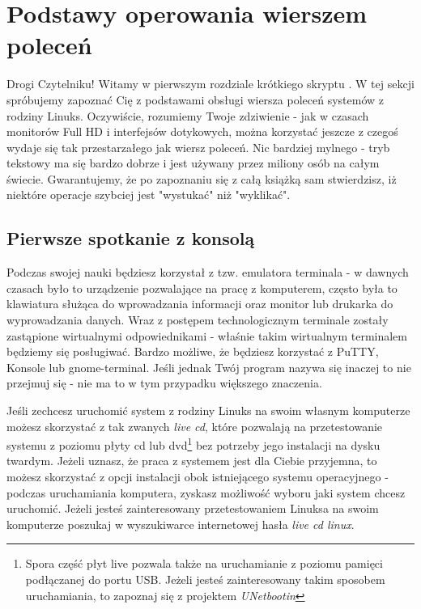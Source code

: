 \chapter{Podstawy operowania wierszem poleceń}
Drogi Czytelniku! \newline
Witamy w pierwszym rozdziale krótkiego skryptu \doctitle.
W tej sekcji spróbujemy zapoznać Cię z podstawami obsługi wiersza poleceń systemów z rodziny Linuks. Oczywiście, rozumiemy Twoje zdziwienie - jak w czasach monitorów Full HD i interfejsów dotykowych, można korzystać jeszcze z czegoś wydaje się tak przestarzałego jak wiersz poleceń. Nic bardziej mylnego - tryb tekstowy ma się bardzo dobrze i jest używany przez miliony osób na całym świecie. Gwarantujemy, że po zapoznaniu się z całą książką sam stwierdzisz, iż niektóre operacje szybciej jest "wystukać" niż "wyklikać".

\section{Pierwsze spotkanie z konsolą}
Podczas swojej nauki będziesz korzystał z tzw. emulatora terminala - w dawnych czasach było to urządzenie pozwalające na pracę z komputerem, często była to klawiatura służąca do wprowadzania informacji oraz monitor lub drukarka do wyprowadzania danych. Wraz z postępem technologicznym terminale zostały zastąpione wirtualnymi odpowiednikami - właśnie takim wirtualnym terminalem będziemy się posługiwać. Bardzo możliwe, że będziesz korzystać z PuTTY, Konsole lub gnome-terminal. Jeśli jednak Twój program nazywa się inaczej to nie przejmuj się - nie ma to w tym przypadku większego znaczenia.

Jeśli zechcesz uruchomić system z rodziny Linuks na swoim własnym komputerze możesz skorzystać z tak zwanych \textit{live cd}, które pozwalają na przetestowanie systemu z poziomu płyty cd lub dvd\footnote{Spora część płyt live pozwala także na uruchamianie z poziomu pamięci podłączanej do portu USB. Jeżeli jesteś zainteresowany takim sposobem uruchamiania, to zapoznaj się z projektem \textit{UNetbootin}} bez potrzeby jego instalacji na dysku twardym. Jeżeli uznasz, że praca z systemem jest dla Ciebie przyjemna, to możesz skorzystać z opcji instalacji obok istniejącego systemu operacyjnego - podczas uruchamiania komputera, zyskasz możliwość wyboru jaki system chcesz uruchomić. Jeżeli jesteś zainteresowany przetestowaniem Linuksa na swoim komputerze poszukaj w wyszukiwarce internetowej hasła \textit{live cd linux}.


